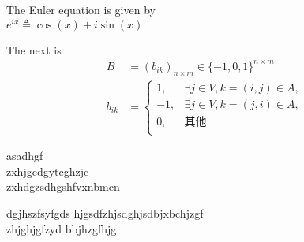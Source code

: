 \documentclass[12pt,a4paper]{article}
\begin{document}
The Euler equation is given by\\[30mm]
$ e^{ix} \triangleq \cos(x) + i\sin(x) $\\\par
The next is\linebreak[4] 
\begin{eqnarray} 
    B&=(b_{ik})_{n \times m}\in\{-1,0,1\}^{n\times m}\\
    b_{ik}&=\begin{cases}
    1, &\exists j\in V,k=(i,j)\in A,\\
    -1, &\exists j\in V,k=(j,i)\in A,\\
    0, &其他\\\end{cases}\end{eqnarray}
\newpage
\renewcommand{\baselinestretch}{5}\selectfont\par  asadhgf\\
zxhjgcdgytcghzjc\\
zxhdgzsdhgshfvxnbmcn\\
\par\setlength{\parskip}{1ex}
dgjhszfsyfgds hjgsdfzhjsdghjsdbjxbchjzgf\\
zhjghjgfzyd bbjhzgfhjg\\
\end{document}
